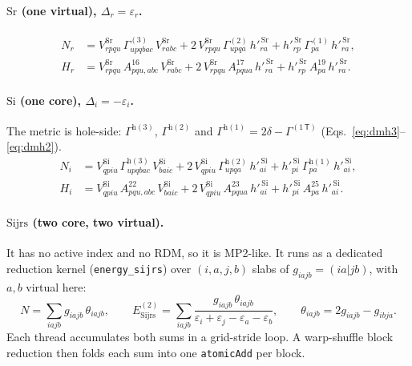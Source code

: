 \documentclass[11pt]{article}
\newcommand{\code}[1]{\texttt{#1}}
\newcommand{\G}[1]{\Gamma^{(#1)}}
\newcommand{\Gh}[1]{\Gamma^{\mathrm{h}(#1)}}
\newcommand{\eps}{\varepsilon}
\newcommand{\cls}[1]{\ensuremath{\mathrm{#1}}}
\begin{document}
\paragraph{\cls{Sr} (one virtual), $\Delta_r = \eps_r$.}
\begin{align}
  N_r &= V^{\cls{Sr}}_{rpqu}\,\G3_{upqbac}\,V^{\cls{Sr}}_{rabc}
       + 2\,V^{\cls{Sr}}_{rpqu}\,\G2_{upqa}\,h'^{\,\cls{Sr}}_{ra}
       + h'^{\,\cls{Sr}}_{rp}\,\G1_{pa}\,h'^{\,\cls{Sr}}_{ra},\\
  H_r &= V^{\cls{Sr}}_{rpqu}\,A^{16}_{pqu,abc}\,V^{\cls{Sr}}_{rabc}
       + 2\,V^{\cls{Sr}}_{rpqu}\,A^{17}_{pqua}\,h'^{\,\cls{Sr}}_{ra}
       + h'^{\,\cls{Sr}}_{rp}\,A^{19}_{pa}\,h'^{\,\cls{Sr}}_{ra}.
\end{align}

\paragraph{\cls{Si} (one core), $\Delta_i = -\eps_i$.} The metric is
hole-side: $\Gh3$, $\Gh2$ and $\Gh1 = 2\delta - \G{1\,\mathsf T}$
(Eqs.~\eqref{eq:dmh3}--\eqref{eq:dmh2}).
\begin{align}
  N_i &= V^{\cls{Si}}_{qpiu}\,\Gh3_{upqbac}\,V^{\cls{Si}}_{baic}
       + 2\,V^{\cls{Si}}_{qpiu}\,\Gh2_{upqa}\,h'^{\,\cls{Si}}_{ai}
       + h'^{\,\cls{Si}}_{pi}\,\Gh1_{pa}\,h'^{\,\cls{Si}}_{ai},\\
  H_i &= V^{\cls{Si}}_{qpiu}\,A^{22}_{pqu,abc}\,V^{\cls{Si}}_{baic}
       + 2\,V^{\cls{Si}}_{qpiu}\,A^{23}_{pqua}\,h'^{\,\cls{Si}}_{ai}
       + h'^{\,\cls{Si}}_{pi}\,A^{25}_{pa}\,h'^{\,\cls{Si}}_{ai}.
\end{align}

\paragraph{\cls{Sijrs} (two core, two virtual).} It has no active index and
no RDM, so it is MP2-like. It runs as a dedicated reduction kernel
(\code{energy\_sijrs}) over $(i, a, j, b)$ slabs of $g_{iajb} = (ia|jb)$, with
$a,b$ virtual here:
\begin{equation}
  N = \sum_{iajb} g_{iajb}\,\theta_{iajb},\qquad
  E^{(2)}_{\cls{Sijrs}} = \sum_{iajb}
     \frac{g_{iajb}\,\theta_{iajb}}{\eps_i+\eps_j-\eps_a-\eps_b},\qquad
  \theta_{iajb} = 2g_{iajb} - g_{ibja}.
  \label{eq:sijrs}
\end{equation}
Each thread accumulates both sums in a grid-stride loop. A warp-shuffle block
reduction then folds each sum into one \code{atomicAdd} per block.
\end{document}
